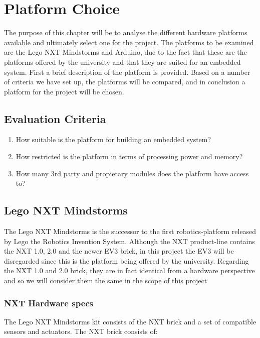 \chapter{Platform Choice}\label{PlatformC}

The purpose of this chapter will be to analyse the different hardware platforms available
and ultimately select one for the project. The platforms to be examined are the
Lego NXT Mindstorms and Arduino, due to the fact that these are the
platforms offered by the university and that they are suited for an embedded
system.
First a brief description of the platform is provided. Based on a number of criteria
 we have set up, the platforms will be compared, and in conclusion a
platform for the project will be chosen.

\section{Evaluation Criteria}

\begin{enumerate}
  \item How suitable is the platform for building an embedded system?
  \item How restricted is the platform in terms of processing power and memory?
  \item How many 3rd party and propietary modules does the platform have access
  to?
\end{enumerate}

\section{Lego NXT Mindstorms}
The Lego NXT Mindstorms is the successor to the first robotics-platform
released by Lego the Robotics Invention System. Although the NXT product-line contains
the NXT 1.0, 2.0 and the newer EV3 brick, in this project the
EV3 will be disregarded since this is the platform being offered by the
university. Regarding the NXT 1.0 and 2.0 brick, they are in fact identical from a
hardware perspective and so we will consider them the same in the scope of this project\nl
\subsection{NXT Hardware specs}

The Lego NXT Mindstorms kit consists of the NXT brick and a set of
compatible sensors and actuators. The NXT brick\citep[P.70]{NXTStats} consists
of:


